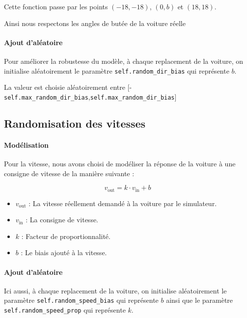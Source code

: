 \documentclass[french]{article}
\begin{document}
Cette fonction passe par les points $(-18, -18)$, $(0, b)$ et $(18, 18)$.

Ainsi nous respectons les angles de butée de la voiture réelle

\paragraph{Ajout d'aléatoire}

Pour améliorer la robustesse du modèle, à chaque replacement de la voiture, on initialise aléatoirement le paramètre \verb|self.random_dir_bias| qui représente $b$.

La valeur est choisie aléatoirement entre [-\verb|self.max_random_dir_bias|,\verb|self.max_random_dir_bias|]

\subsection{Randomisation des vitesses}

\paragraph{Modélisation}

Pour la vitesse, nous avons choisi de modéliser la réponse de la voiture à une consigne de vitesse de la manière suivante :

\begin{equation}
    v_{\mathrm{out}} = k \cdot v_{\mathrm{in}} + b
\end{equation}

\begin{itemize}
    \item \(v_{\mathrm{out}}\) : La vitesse réellement demandé à la voiture par le simulateur.
    \item \(v_{\mathrm{in}}\) : La consigne de vitesse.
    \item \(k\) : Facteur de proportionnalité.
    \item \(b\) : Le biais ajouté à la vitesse.
\end{itemize}

\paragraph{Ajout d'aléatoire}

Ici aussi, à chaque replacement de la voiture, on initialise aléatoirement le paramètre \verb|self.random_speed_bias| qui représente $b$ ainsi que le paramètre \verb|self.random_speed_prop| qui représente $k$.
\end{document}
